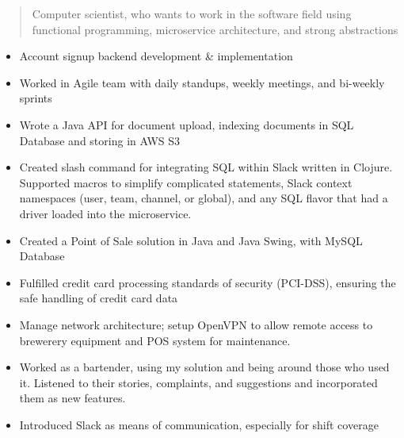 \documentclass[10pt,a4paper]{altacv}
\begin{document}


\begin{fullwidth}
\makecvheader
\end{fullwidth}

\begin{quote}
Computer scientist, who wants to work in the software field using functional programming, microservice architecture, and strong abstractions
\end{quote}




\begin{itemize}
    \item Account signup backend development \& implementation
    \item Worked in Agile team with daily standups, weekly meetings, and bi-weekly sprints
    \item Wrote a Java API for document upload, indexing documents in SQL Database and storing in AWS S3
    \item Created slash command for integrating SQL within Slack written in Clojure. Supported macros to simplify complicated statements, Slack context namespaces (user, team, channel, or global), and any SQL flavor that had a driver loaded into the microservice.
\end{itemize}

\bigskip


\divider

\begin{itemize}
    \item Created a Point of Sale solution in Java and Java Swing, with MySQL Database
    \item Fulfilled credit card processing standards of security (PCI-DSS), ensuring the safe handling of credit card data
    \item Manage network architecture; setup OpenVPN to allow remote access to brewerery equipment and POS system for maintenance.
    \item Worked as a bartender, using my solution and being around those who used it. Listened to their stories, complaints, and suggestions and incorporated them as new features.
    \item Introduced Slack as means of communication, especially for shift coverage
\end{itemize}

\bigskip

\end{document}
